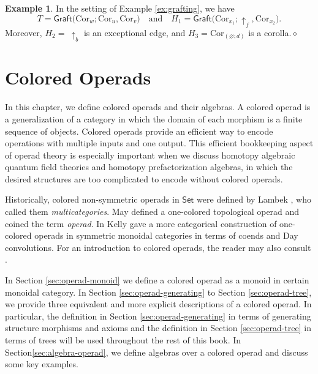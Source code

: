 \documentclass{amsbook}
\numberwithin{section}{chapter}
\numberwithin{subsection}{section}
\numberwithin{equation}{section}
\theoremstyle{plain}
\theoremstyle{definition}
\newtheorem{example}[equation]{Example}
\newcommand{\Cor}{\mathrm{Cor}}
\newcommand{\graft}{\mathsf{Graft}}
\newcommand{\dqed}{\hfill$\diamond$}
\newcommand{\Set}{\mathsf{Set}}
\newcommand{\andspace}{\quad\text{and}\quad}
\begin{document}
\begin{example}\label{ex2:grafting}
In the setting of Example \ref{ex:grafting}, we have \[T = \graft\bigl(\Cor_w; \Cor_u,\Cor_v\bigr) \andspace H_1=\graft\bigl(\Cor_{x_1}; \uparrow_f,\Cor_{x_2}\bigr).\] Moreover, $H_2=~\uparrow_b$ is an exceptional edge, and $H_3=\Cor_{(\varnothing;d)}$ is a corolla.\dqed
\end{example}



\chapter{Colored Operads}\label{ch:operads}

In this chapter, we define colored operads and their algebras.  A colored operad is a generalization of a category in which the domain of each morphism is a finite sequence of objects.  Colored operads provide an efficient way to encode operations with multiple inputs and one output.  This efficient bookkeeping aspect of operad theory is especially important when we discuss homotopy algebraic quantum field theories and homotopy prefactorization algebras, in which the desired structures are too complicated to encode without colored operads.

Historically, colored non-symmetric operads in $\Set$ were defined by Lambek \cite{lambek}, who called them \emph{multicategories}.  May \cite{may} defined a one-colored topological operad and coined the term \emph{operad}.  In \cite{kelly} Kelly gave a more categorical construction of one-colored operads in symmetric monoidal categories in terms of coends and Day convolutions.  For an introduction to colored operads, the reader may also consult \cite{bsw,white-yau,yau-operad}.

In Section \ref{sec:operad-monoid} we define a colored operad as a monoid in certain monoidal category.  In Section \ref{sec:operad-generating} to Section \ref{sec:operad-tree}, we provide three equivalent and more explicit descriptions of a colored operad.  In particular, the definition in Section \ref{sec:operad-generating} in terms of generating structure morphisms and axioms and the definition in Section \ref{sec:operad-tree} in terms of trees will be used throughout the rest of this book.  In Section\ref{sec:algebra-operad}, we define algebras over a colored operad and discuss some key examples.  
\end{document}

